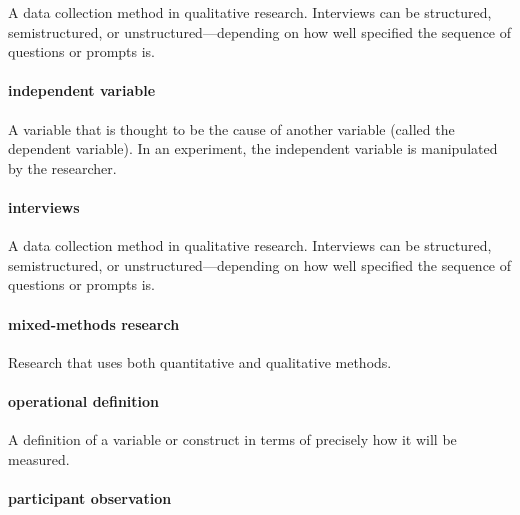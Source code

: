 \documentclass[
]{krantz}
\begin{document}
A data collection method in qualitative research. Interviews can be structured, semistructured, or unstructured---depending on how well specified the sequence of questions or prompts is.

\hypertarget{independent-variable}{%
\paragraph*{independent variable}\label{independent-variable}}

A variable that is thought to be the cause of another variable (called the dependent variable). In an experiment, the independent variable is manipulated by the researcher.

\hypertarget{interviews}{%
\paragraph*{interviews}\label{interviews}}

A data collection method in qualitative research. Interviews can be structured, semistructured, or unstructured---depending on how well specified the sequence of questions or prompts is.

\hypertarget{mixed-methods-research}{%
\paragraph*{mixed-methods research}\label{mixed-methods-research}}

Research that uses both quantitative and qualitative methods.

\hypertarget{operational-definition}{%
\paragraph*{operational definition}\label{operational-definition}}

A definition of a variable or construct in terms of precisely how it will be measured.

\hypertarget{participant-observation}{%
\paragraph*{participant observation}\label{participant-observation}}
\end{document}
